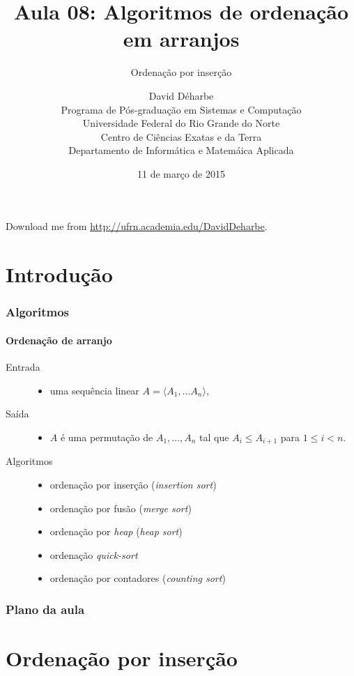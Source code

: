 \documentclass{beamer}
\title{Aula 08: Algoritmos de ordenação em arranjos}
\subtitle{Ordenação por inserção}
\author{David Déharbe \\
  Programa de Pós-graduação em Sistemas e Computação \\
  Universidade Federal do Rio Grande do Norte \\
  Centro de Ciências Exatas e da Terra \\
  Departamento de Informática e Matemáica Aplicada}
\date{11 de março de 2015}
\begin{document}
\begin{frame}
  \titlepage
  Download me from \url{http://ufrn.academia.edu/DavidDeharbe}.
\end{frame}

\section{Introdução}

\begin{frame}

  \frametitle{Algoritmos}
  \framesubtitle{Ordenação de arranjo}

  \begin{description}
    \item[Entrada]
      \begin{itemize}
        \item uma sequência linear $A = \langle A_1, \dots A_n \rangle$,
      \end{itemize}
    \item[Saída] 
      \begin{itemize}
        \item $A$ é uma permutação de $A_1, \dots, A_n$ tal que 
          $A_i \le A_{i+1}$ para $1 \le i < n$.
      \end{itemize}
    \item[Algoritmos]
      \begin{itemize}
      \item ordenação por inserção (\textit{insertion sort})
      \item ordenação por fusão (\textit{merge sort})
      \item ordenação por \textit{heap} (\textit{heap sort})
      \item ordenação \textit{quick-sort}
      \item ordenação por contadores (\textit{counting sort})
      \end{itemize}
  \end{description}

\end{frame}

\begin{frame}
  \frametitle{Plano da aula}
  \tableofcontents
\end{frame}

\section{Ordenação por inserção}
\end{document}
